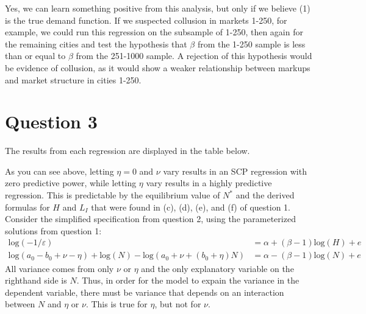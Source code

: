 \documentclass{article}
\newcommand{\loge}[1]{\text{log}\left(#1\right)}
\begin{document}
Yes, we can learn something positive from this analysis, but only if we believe (1) is the true demand function. If we suspected collusion in markets 1-250, for example, we could run this regression on the subsample of 1-250, then again for the remaining cities and test the hypothesis that $\beta$ from the 1-250 sample is less than or equal to $\beta$ from the 251-1000 sample. A rejection of this hypothesis would be evidence of collusion, as it would show a weaker relationship between markups and market structure in cities 1-250.


\section*{Question 3}
The results from each regression are displayed in the table below.
\begin{center}
  
\end{center}
As you can see above, letting ${\eta=0}$ and $\nu$ vary results in an SCP regression with zero predictive power, while letting $\eta$ vary results in a highly predictive regression. This is predictable by the equilibrium value of $N^*$ and the derived formulas for $H$ and $L_I$ that were found in (c), (d), (e), and (f) of question 1. Consider the simplified specification from question 2, using the parameterized solutions from question 1:{\small \begin{align*}
  \loge{-1/\varepsilon} &= \alpha + (\beta-1)\loge{H} + e \\
  \loge{a_0 - b_0 + \nu - \eta} + \loge{N} - \loge{a_0 + \nu + (b_0 + \eta)N}  
    &= \alpha - (\beta-1)\loge{N} + e 
\end{align*} }
All variance comes from only $\nu$ or $\eta$ and the only explanatory variable on the righthand side is $N$. Thus, in order for the model to expain the variance in the dependent variable, there must be variance that depends on an interaction between $N$ and $\eta$ or $\nu$. This is true for $\eta$, but not for $\nu$.


\end{document}
